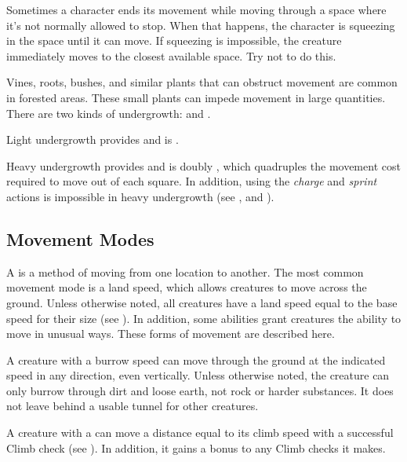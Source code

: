          Sometimes a character ends its movement while moving through a space where it's not normally allowed to stop. When that happens, the character is squeezing in the space until it can move. If squeezing is impossible, the creature immediately moves to the closest available space. Try not to do this.

        \label{Undergrowth} Vines, roots, bushes, and similar plants that can obstruct movement are common in forested areas.
        These small plants can impede movement in large quantities.
        There are two kinds of undergrowth:  and .

        \label{Light Undergrowth}
        Light undergrowth provides  and is .

        \label{Heavy Undergrowth}
        Heavy undergrowth provides  and is doubly , which quadruples the movement cost required to move out of each square.
        In addition, using the \textit{charge} and \textit{sprint} actions is impossible in heavy undergrowth (see , and ).

    \subsection{Movement Modes}\label{Movement Modes}
        A  is a method of moving from one location to another.
        The most common movement mode is a land speed, which allows creatures to move across the ground.
        Unless otherwise noted, all creatures have a land speed equal to the base speed for their size (see ).
        In addition, some abilities grant creatures the ability to move in unusual ways.
        These forms of movement are described here.

        A creature with a burrow speed can move through the ground at the indicated speed in any direction, even vertically. Unless otherwise noted, the creature can only burrow through dirt and loose earth, not rock or harder substances. It does not leave behind a usable tunnel for other creatures.

        A creature with a  can move a distance equal to its climb speed with a successful Climb check (see ).
        In addition, it gains a  bonus to any Climb checks it makes.

